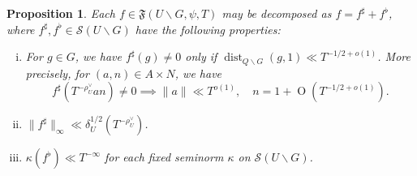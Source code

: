 \documentclass[reqno]{amsart}
\DeclareMathOperator{\dist}{dist}
\def\O{\operatorname{O}}
\theoremstyle{plain} \newtheorem{theorem} {Theorem}
\newtheorem{proposition} [theorem] {Proposition}
\theoremstyle{definition} \newtheorem{definition} [theorem] {Definition}
\theoremstyle{itplain} %
\numberwithin{equation}{section}
\numberwithin{theorem}{section}
\begin{document}
\begin{proposition}\label{prop:standard:each-f-in}
  Each $f \in \mathfrak{F}(U \backslash G, \psi, T)$ may be decomposed as $f = f^\sharp + f^\flat$, where $f ^\sharp, f^{\flat} \in \mathcal{S}(U \backslash G)$ have the following properties:
  \begin{enumerate}[(i)]
  \item \label{itm:standard:prop-decompose-frakF-4} For $g \in G$, we have $f ^\sharp (g) \neq 0$ only if $\dist_{Q \backslash G}(g,1) \ll T^{-1/2 + o(1)}$.  More precisely, for $(a,n) \in A \times N$, we have
    \begin{equation*}
      f ^\sharp (T^{-\rho _U^\vee} a n) \neq 0 \implies \|a\| \ll T^{o(1)}, \quad n = 1 + \O(T^{-1/2+o(1)}).
    \end{equation*}
  \item $\|f ^\sharp \|_{\infty} \ll \delta_U^{1/2}(T^{-\rho_U^\vee})$.
  \item $\kappa(f^{\flat}) \ll T^{-\infty}$ for each fixed seminorm $\kappa$ on $\mathcal{S}(U \backslash G)$.
  \end{enumerate}
\end{proposition}
\end{document}

